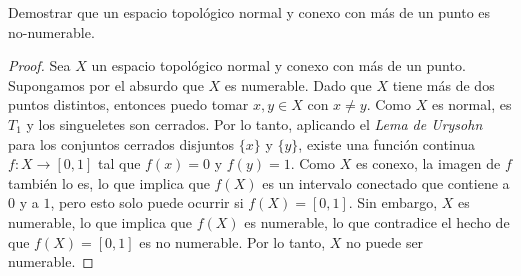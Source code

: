 \documentclass{article}
\theoremstyle{plain}
\theoremstyle{definition}
\newenvironment{ejercicio}[1]{\begin{trivlist}
\item[\hskip \labelsep {\bfseries Ejercicio}\hskip \labelsep {\bfseries #1.}]}{\end{trivlist}}
\begin{document}
\begin{ejercicio}{8}
    Demostrar que un espacio topológico normal y conexo con más de un punto es no-numerable.
\end{ejercicio}
\begin{proof}
    Sea \( X \) un espacio topológico normal y conexo con más de un punto. Supongamos por el absurdo que \( X \) es numerable.
    Dado que \( X \) tiene más de dos puntos distintos, entonces puedo tomar \( x, y \in X \) con \( x \neq y \). Como \( X \) es normal, es \( T_1 \) y los singueletes son cerrados. Por lo tanto, aplicando el
    \emph{Lema de Urysohn} para los conjuntos cerrados disjuntos \( \{ x \} \) y \( \{ y \} \), existe una función continua \( f : X \to [0, 1] \) tal que \( f(x) = 0 \) y \( f(y) = 1 \). Como \( X \) es conexo,
    la imagen de \( f \) también lo es, lo que implica que \( f(X) \) es un intervalo conectado que contiene a \( 0 \) y a \( 1 \), pero esto solo puede ocurrir si \( f(X) = [0, 1] \). Sin embargo, \( X \) es numerable,
    lo que implica que \( f(X) \) es numerable, lo que contradice el hecho de que \( f(X) = [0, 1] \) es no numerable. Por lo tanto, \( X \) no puede ser numerable.
\end{proof}
\end{document}
